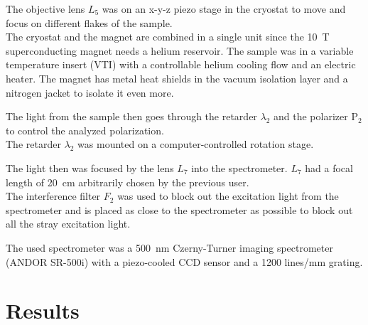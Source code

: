 \documentclass[
	twoside,
	parskip=half,
	a4paper,
]{scrbook}
\begin{document}
The objective lens $L_5$ was on an x-y-z piezo stage in the cryostat to move and focus on different flakes of the sample.\\
The cryostat and the magnet are combined in a single unit since the \SI{10}{T} superconducting magnet needs a helium reservoir.
The sample was in a variable temperature insert (VTI) with a controllable helium cooling flow and an electric heater.
The magnet has metal heat shields in the vacuum isolation layer and a nitrogen jacket to isolate it even more.

The light from the sample then goes through the retarder $\lambda_2$ and the polarizer P$_2$ to control the analyzed polarization.\\
The retarder $\lambda_2$ was mounted on a computer-controlled rotation stage.

The light then was focused by the lens $L_7$ into the spectrometer.
$L_7$ had a focal length of \SI{20}{cm} arbitrarily chosen by the previous user.\\
The interference filter $F_2$ was used to block out the excitation light from the spectrometer and is placed as close to the spectrometer as possible to block out all the stray excitation light.

The used spectrometer was a \SI{500}{nm} Czerny-Turner imaging spectrometer (ANDOR SR-500i) with a piezo-cooled CCD sensor and a 1200 lines/mm grating.


\chapter{Results}
\end{document}
